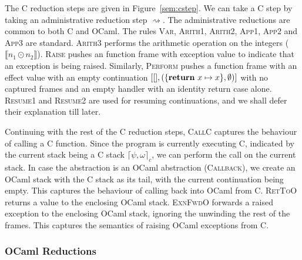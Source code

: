 \documentclass[sigplan,10pt,review,anonymous]{acmart}\settopmatter{printfolios=true,printccs=false,printacmref=false}
\newcommand{\kw}[1]{\text{\bf #1}}
\newcommand{\caseval}[2]{\kw{return}~#1 \mapsto #2}
\newcommand{\fl}{\psi} %
\newcommand{\ostack}{\omega} %
\newcommand{\cstacka}[2]{\big \lceil #1, #2 \big \rceil_c} %
\begin{document}
The C reduction steps are given in Figure~\ref{sem:cstep}. We can take a C step
by taking an administrative reduction step $\rightsquigarrow$. The
administrative reductions are common to both C and OCaml. The rules
\textsc{Var}, \textsc{Arith1}, \textsc{Arith2}, \textsc{App1}, \textsc{App2}
and \textsc{App3} are standard. \textsc{Arith3} performs the arithmetic
operation on the integers ($\llbracket n_1 \odot n_2 \rrbracket$).
\textsc{Raise} pushes an function frame with exception value to indicate that
an exception is being raised. Similarly, \textsc{Perform} pushes a function
frame with an effect value with an empty continuation
$[[],(\{\caseval{x}{x}\},\emptyset)]$ with no captured frames and an empty
handler with an identity return case alone. \textsc{Resume1} and
\textsc{Resume2} are used for resuming continuations, and we shall defer their
explanation till later.

Continuing with the rest of the C reduction steps, \textsc{CallC} captures the
behaviour of calling a C function. Since the program is currently executing C,
indicated by the current stack being a C stack $\cstacka{\fl}{\ostack}$, we can
perform the call on the current stack. In case the abstraction is an OCaml
abstraction (\textsc{Callback}), we create an OCaml stack with the C stack as
its tail, with the current continuation being empty. This captures the
behaviour of calling back into OCaml from C. \textsc{RetToO} returns a value to
the enclosing OCaml stack. \textsc{ExnFwdO} forwards a raised exception to the
enclosing OCaml stack, ignoring the unwinding the rest of the frames. This
captures the semantics of raising OCaml exceptions from C.

\subsubsection{OCaml Reductions}
\end{document}
